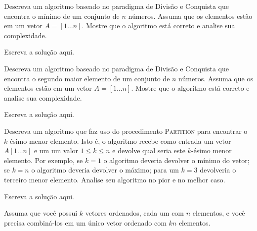 \documentclass[a4paper]{exam}
\begin{document}
\begin{questions}
  \question Descreva um algoritmo baseado no paradigma de Divisão
  e Conquista que encontra o mínimo de um conjunto de $n$ números.
  Assuma que os elementos estão em um vetor $A = [1\ldots n]$.
  Mostre que o algoritmo está correto e analise sua complexidade.
  \begin{solution}
    Escreva a solução aqui.
  \end{solution}
  \question Descreva um algoritmo baseado no paradigma de Divisão
  e Conquista que encontra o segundo maior elemento de um conjunto
  de $n$ números. Assuma que os elementos estão
  em um vetor $A = [1\ldots n]$. Mostre que o algoritmo está
  correto e analise sua complexidade.
  \begin{solution}
    Escreva a solução aqui.
  \end{solution}
  \question Descreva um algoritmo que faz uso do procedimento
  \textsc{Partition} para encontrar o $k$-ésimo menor elemento.
  Isto é, o algoritmo recebe como entrada um vetor $A[1 \ldots n]$ e um
  um valor $1 \leq k \leq n$ e devolve qual seria este $k$-ésimo
  menor elemento. Por exemplo, se $k = 1$ o algoritmo deveria
  devolver o mínimo do vetor; se $k=n$ o algoritmo deveria devolver
  o máximo; para um $k=3$ devolveria o terceiro menor elemento.
  Analise seu algoritmo no pior e no melhor caso.
  \begin{solution}
    Escreva a solução aqui.
  \end{solution}
  \question Assuma que você possui $k$ vetores ordenados, cada um
  com $n$ elementos, e você precisa combiná-los em um único vetor
  ordenado com $k n$ elementos.
\end{questions}
\end{document}
